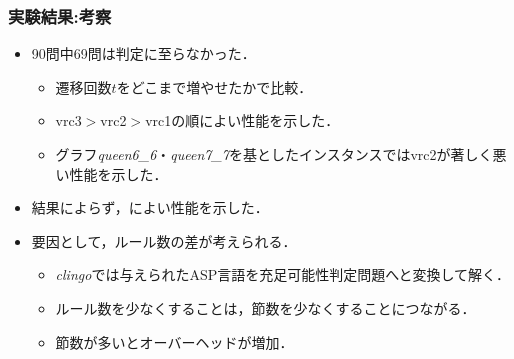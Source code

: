 \documentclass[dvipdfmx,11pt]{beamer}
\begin{document}
\begin{frame}\frametitle{実験結果:考察}

  \begin{itemize}
    \item 90問中69問は判定に至らなかった．
    \begin{itemize}
      \item 遷移回数$t$をどこまで増やせたかで比較．
      \item vrc3$>$vrc2$>$vrc1の順によい性能を示した．
      \item グラフ\textit{queen6\_6}・\textit{queen7\_7}を基としたインスタンスではvrc2が著しく悪い性能を示した．
    \end{itemize}
    \item 結果によらず，によい性能を示した．
    \item 要因として，ルール数の差が考えられる．
    \begin{itemize}
      \item \textit{clingo}では与えられたASP言語を充足可能性判定問題へと変換して解く．
      \item ルール数を少なくすることは，節数を少なくすることにつながる．
      \item 節数が多いとオーバーヘッドが増加．
    \end{itemize}
  \end{itemize}
  
\end{frame}

\end{document}
